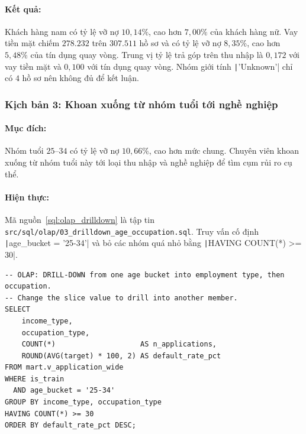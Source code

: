 \paragraph{Kết quả:} Khách hàng nam có tỷ lệ vỡ nợ $10{,}14\%$, cao hơn $7{,}00\%$ của khách hàng nữ. Vay tiền mặt chiếm $278.232$ trên $307.511$ hồ sơ và có tỷ lệ vỡ nợ $8{,}35\%$, cao hơn $5{,}48\%$ của tín dụng quay vòng. Trung vị tỷ lệ trả góp trên thu nhập là $0{,}172$ với vay tiền mặt và $0{,}100$ với tín dụng quay vòng. Nhóm giới tính \texttt|'Unknown'| chỉ có $4$ hồ sơ nên không đủ để kết luận.

\subsubsection*{Kịch bản 3: Khoan xuống từ nhóm tuổi tới nghề nghiệp}
\paragraph{Mục đích:} Nhóm tuổi $25$--$34$ có tỷ lệ vỡ nợ $10{,}66\%$, cao hơn mức chung. Chuyên viên khoan xuống từ nhóm tuổi này tới loại thu nhập và nghề nghiệp để tìm cụm rủi ro cụ thể.
\paragraph{Hiện thực:} Mã nguồn~\ref{sql:olap_drilldown} là tập tin \texttt{src/sql/olap/}\allowbreak\texttt{03\_drilldown\_age\_occupation.sql}. Truy vấn cố định \texttt|age_bucket = '25-34'| và bỏ các nhóm quá nhỏ bằng \texttt|HAVING COUNT(*) >= 30|.

\begin{listing}[H]
	\footnotesize
	\begin{verbatim}
-- OLAP: DRILL-DOWN from one age bucket into employment type, then occupation.
-- Change the slice value to drill into another member.
SELECT
    income_type,
    occupation_type,
    COUNT(*)                    AS n_applications,
    ROUND(AVG(target) * 100, 2) AS default_rate_pct
FROM mart.v_application_wide
WHERE is_train
  AND age_bucket = '25-34'
GROUP BY income_type, occupation_type
HAVING COUNT(*) >= 30
ORDER BY default_rate_pct DESC;
\end{verbatim}
	\caption{Truy vấn khoan xuống từ nhóm tuổi tới nghề nghiệp}
	\label{sql:olap_drilldown}
\end{listing}

